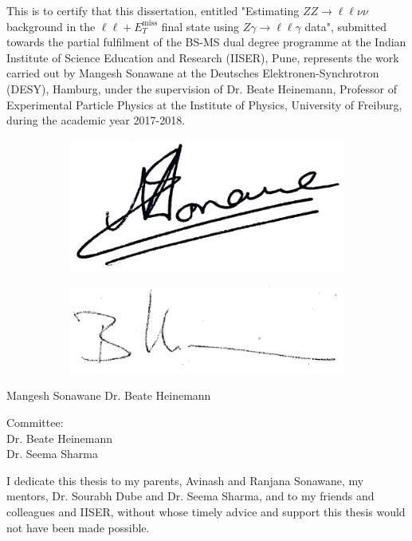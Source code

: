 \documentclass[12pt,a4paper,openright,twoside]{report}
\newcommand{\ZZ}{$ZZ\to \ell\ell\nu\nu$ }
\newcommand{\Zg}{$Z\gamma\to \ell\ell\gamma$ }
\newcommand{\llM}{$\ell\ell+E_T^{\mathrm{miss}}$ }
\newcommand\blankpage{%
    \null
    \thispagestyle{empty}%
    \addtocounter{page}{-1}%
    \newpage}
\begin{document}
\vspace{1cm}
\normalsize This is to certify that this dissertation, entitled "Estimating \ZZ background in the \llM final state using \Zg data", submitted towards the partial fulfilment of the BS-MS dual degree programme at the Indian Institute of Science Education and Research (IISER), Pune, represents the work carried out by Mangesh Sonawane at the Deutsches Elektronen-Synchrotron (DESY), Hamburg, under the supervision of Dr. Beate Heinemann, Professor of Experimental Particle Physics at the Institute of Physics, University of Freiburg, during the academic year 2017-2018.
\vfill
\begin{figure}[H]
	\hspace{1cm}
	\begin{subfigure}{0.49\textwidth}
	\includegraphics[width=0.4\linewidth]{sign.jpg}
	\end{subfigure}\hspace{1cm}
	\begin{subfigure}{0.49\textwidth}
	\centering
	\includegraphics[width=0.7\linewidth]{Beate_sign.jpg}
	\end{subfigure}
\end{figure}
\begin{center}
Mangesh Sonawane\hspace{8cm}
Dr. Beate Heinemann
\end{center}
\vfill
Committee:\\
Dr. Beate Heinemann\\
Dr. Seema Sharma
\vfill
\vfill
\newpage
\blankpage
\newpage
{}
\vspace*{\fill}
\noindent I dedicate this thesis to my parents, Avinash and Ranjana Sonawane, my mentors, Dr. Sourabh Dube and Dr. Seema Sharma, and to my friends and colleagues and IISER, without whose timely advice and support this thesis would not have been made possible.
\vspace*{\fill}
\end{document}
